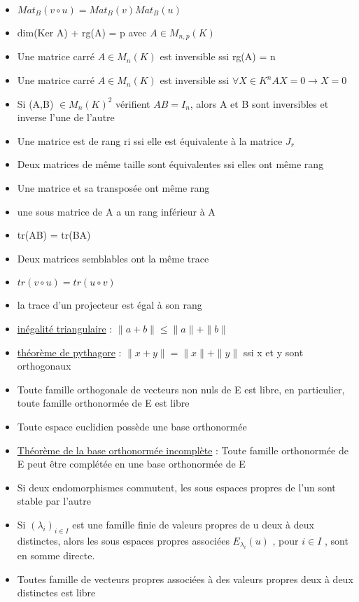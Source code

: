 \documentclass{book}
\begin{document}
\begin{itemize}[label=$\ast$]
	\item 	\( Mat_B(v \circ u) = Mat_B(v)Mat_B(u) \)
	\item dim(Ker A) + rg(A) = p avec \(A \in M_{n,p}(K)\)
	\item Une matrice carré \( A \in M_n(K) \) est inversible ssi rg(A) = n
	\item Une matrice carré \( A \in M_n(K) \) est inversible ssi \( \forall X \in K^n AX=0 \rightarrow X=0 \)
	\item Si (A,B) \( \in M_n(K)^2 \) vérifient \(AB = I_n\), alors A et B sont inversibles et inverse l'une de l'autre
	\item Une matrice est de rang ri ssi elle est équivalente à la matrice \( J_r \)
	\item Deux matrices de même taille sont équivalentes ssi elles ont même rang
	\item Une matrice et sa transposée ont même rang
	\item une sous matrice de A a un rang inférieur à A
	\item tr(AB) = tr(BA)
	\item Deux matrices semblables ont la même trace
	\item \(tr(v \circ u) = tr(u \circ v) \)
	\item la trace d'un projecteur est égal à son rang
	\item \underline{inégalité triangulaire} : \( \|a + b\| \leq \|a\| + \|b\| \)
	\item \underline{théorème de pythagore} : \( \|x + y\| = \|x\| + \|y\| \) ssi x et y sont orthogonaux
	\item Toute famille orthogonale de vecteurs non nuls de E est libre, en particulier, toute famille orthonormée de E est libre
	\item Toute espace euclidien possède une base orthonormée
	\item \underline{Théorème de la base orthonormée incomplète} : Toute famille orthonormée de E peut être complétée en une base orthonormée de E
	\item Si deux endomorphismes commutent, les sous espaces propres de l'un sont stable par l'autre
	\item Si \( (\lambda_i)_{i \in I} \) est une famille finie de valeurs propres de u deux à deux distinctes, alors les sous espaces propres associées \(E_{\lambda_{i}}(u)\) , pour \(i \in I \) , sont en somme directe.
	\item  Toutes famille de vecteurs propres associées à des valeurs propres deux à deux distinctes est libre

\end{itemize}
\end{document}
